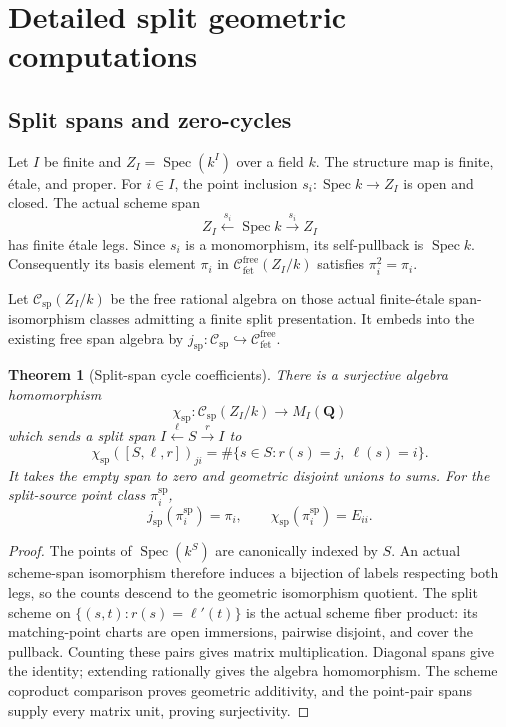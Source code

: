 \documentclass[11pt]{article}
\newtheorem{theorem}{Theorem}[section]
\theoremstyle{definition}
\theoremstyle{remark}
\DeclareMathOperator{\Spec}{Spec}
\newcommand{\Q}{\mathbf Q}
\newcommand{\fe}{\mathrm{f\acute et}}
\begin{document}
\section{Detailed split geometric computations}
\label{app:split-computations}

\subsection{Split spans and zero-cycles}
\label{app:split-span-computations}

Let \(I\) be finite and \(Z_I=\Spec(k^I)\) over a field \(k\).  The
structure map is finite, \'etale, and proper.  For \(i\in I\), the point inclusion
\(s_i:\Spec k\to Z_I\) is open and closed.  The actual scheme span
\[
  Z_I\xleftarrow{s_i}\Spec k\xrightarrow{s_i}Z_I
\]
has finite \'etale legs.  Since \(s_i\) is a monomorphism, its self-pullback
is \(\Spec k\).  Consequently its basis element \(\pi_i\) in
\(\mathcal C^{\mathrm{free}}_{\fe}(Z_I/k)\) satisfies
\(\pi_i^2=\pi_i\).

Let \(\mathcal C_{\mathrm{sp}}(Z_I/k)\) be the free rational algebra on
those actual finite-\'etale span-isomorphism classes admitting a finite split
presentation.  It embeds into the existing free span algebra by
\(j_{\mathrm{sp}}:\mathcal C_{\mathrm{sp}}\hookrightarrow
\mathcal C^{\mathrm{free}}_{\fe}\).

\begin{theorem}[Split-span cycle coefficients]
\label{thm:split-span-realization}
There is a surjective algebra homomorphism
\[
  \chi_{\mathrm{sp}}:\mathcal C_{\mathrm{sp}}(Z_I/k)
      \longrightarrow M_I(\Q)
\]
which sends a split span \(I\xleftarrow{\ell}S\xrightarrow{r}I\) to
\[
  \chi_{\mathrm{sp}}([S,\ell,r])_{ji}
    =\#\{s\in S:r(s)=j,\ \ell(s)=i\}.
\]
It takes the empty span to zero and geometric disjoint unions to sums.
For the split-source point class \(\pi_i^{\mathrm{sp}}\),
\[
  j_{\mathrm{sp}}(\pi_i^{\mathrm{sp}})=\pi_i,
  \qquad \chi_{\mathrm{sp}}(\pi_i^{\mathrm{sp}})=E_{ii}.
\]
\end{theorem}

\begin{proof}
The points of \(\Spec(k^S)\) are canonically indexed by \(S\).  An actual
scheme-span isomorphism therefore induces a bijection of labels respecting
both legs, so the counts descend to the geometric isomorphism quotient.
The split scheme on
\(\{(s,t):r(s)=\ell'(t)\}\) is the actual scheme fiber product: its
matching-point charts are open immersions, pairwise disjoint, and cover the
pullback.  Counting these pairs gives matrix multiplication.  Diagonal spans
give the identity; extending rationally gives the algebra homomorphism.
The scheme coproduct comparison proves geometric additivity, and the
point-pair spans supply every matrix unit, proving surjectivity.
\end{proof}
\end{document}
